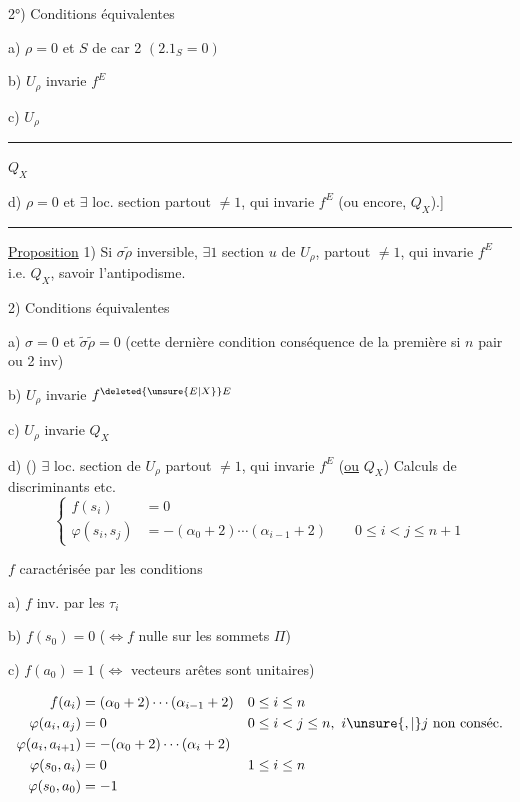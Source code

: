 2°) Conditions équivalentes

a) $\rho=0$ et  $S$ de car 2 $(2.1_S=0)$

b) $U_\rho$ invarie $f^E$

c) $U_\rho$ \rule{1.5cm}{0.35pt} $Q_X$

d) $\rho=0$ et $\exists$ loc. section partout $\ne1$, qui invarie $f^E$ (ou encore, $Q_X$).]

\begin{center}\rule{4cm}{0.35pt}\end{center}

\uline{Proposition} 1) Si $\sigma\widetilde\rho$ inversible, $\exists1$ section $u$ de $U_\rho$, partout $\ne1$, qui invarie $f^E$ i.e. $Q_X$, savoir l'antipodisme.

2) Conditions équivalentes

a) $\sigma=0$ et $\widetilde\sigma\widetilde\rho=0$ (cette dernière condition conséquence de la première si $n$ pair ou 2 inv)

b) $U_\rho$ invarie $f^{\deleted{\unsure{E|X}}E}$

c) $U_\rho$ invarie $Q_X$

d) () $\exists$ loc. section de $U_\rho$ partout $\ne1$, qui invarie $f^E$ (\uline{ou} $Q_X$)
Calculs de discriminants etc.
\[
\left\{\begin{aligned}
f(s_i)&=0\\
\varphi(s_i,s_j)&=-(\alpha_0+2)\cdots(\alpha_{i-1}+2)\qquad 0\le i<j\le n+1
\end{aligned}\right.
\]

$f$ caractérisée par les conditions

a) $f$ inv. par les $\tau_i$

b) $f(s_0)=0$ ($\iff f$ nulle sur les sommets   $\Pi$)

c) $f(a_0)=1$ ($\iff$  vecteurs arêtes sont unitaires)

\[
\begin{aligned}
f(a_i)&=(\alpha_0+2)\cdots(\alpha_{i-1}+2) &&0\le i\le n\\
\varphi(a_i,a_j)&=0 &&0\le i<j\le n,\ i\unsure{,|{}}j\ \text{non conséc.}\\
\varphi(a_i,a_{i+1})&=-(\alpha_0+2)\cdots(\alpha_i+2)\\
\varphi(s_0,a_i)&=0 &&1\le i\le n\\
\varphi(s_0,a_0)&=-1
\end{aligned}
\]

